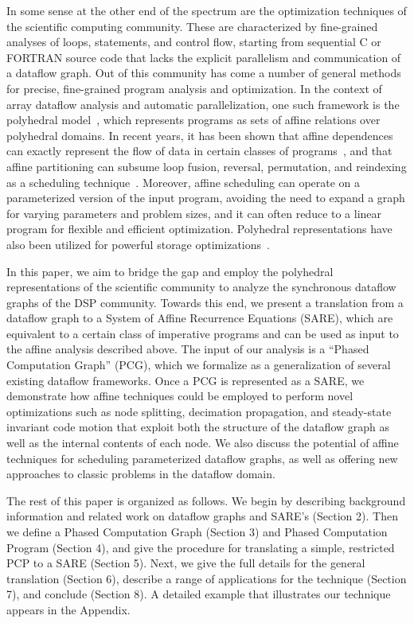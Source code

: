 In some sense at the other end of the spectrum are the optimization
techniques of the scientific computing community.  These are
characterized by fine-grained analyses of loops, statements, and
control flow, starting from sequential C or FORTRAN source code that
lacks the explicit parallelism and communication of a dataflow graph.
Out of this community has come a number of general methods for
precise, fine-grained program analysis and optimization.  In the
context of array dataflow analysis and automatic parallelization, one
such framework is the polyhedral model~\cite{DRV00}, which represents
programs as sets of affine relations over polyhedral domains. In
recent years, it has been shown that affine dependences can exactly
represent the flow of data in certain classes of
programs~\cite{Feautrier92i}, and that affine partitioning can subsume
loop fusion, reversal, permutation, and reindexing as a scheduling
technique~\cite{Lim98}.  Moreover, affine scheduling can operate on a
parameterized version of the input program, avoiding the need to
expand a graph for varying parameters and problem sizes, and it can
often reduce to a linear program for flexible and efficient
optimization.  Polyhedral representations have also been utilized for
powerful storage
optimizations~\cite{Lim01,Quillere,Thies01,Lefebvre98}.

In this paper, we aim to bridge the gap and employ the polyhedral
representations of the scientific community to analyze the synchronous
dataflow graphs of the DSP community.  Towards this end, we present a
translation from a dataflow graph to a System of Affine Recurrence
Equations (SARE), which are equivalent to a certain class of
imperative programs and can be used as input to the affine analysis
described above.  The input of our analysis is a ``Phased Computation
Graph'' (PCG), which we formalize as a generalization of several
existing dataflow frameworks.  Once a PCG is represented as a SARE, we
demonstrate how affine techniques could be employed to perform novel
optimizations such as node splitting, decimation propagation, and
steady-state invariant code motion that exploit both the structure of
the dataflow graph as well as the internal contents of each node.  We
also discuss the potential of affine techniques for scheduling
parameterized dataflow graphs, as well as offering new approaches to
classic problems in the dataflow domain.

The rest of this paper is organized as follows.  We begin by
describing background information and related work on dataflow graphs
and SARE's (Section 2).  Then we define a Phased Computation Graph
(Section 3) and Phased Computation Program (Section 4), and give the
procedure for translating a simple, restricted PCP to a SARE (Section
5).  Next, we give the full details for the general translation
(Section 6), describe a range of applications for the technique
(Section 7), and conclude (Section 8).  A detailed example that
illustrates our technique appears in the Appendix.
